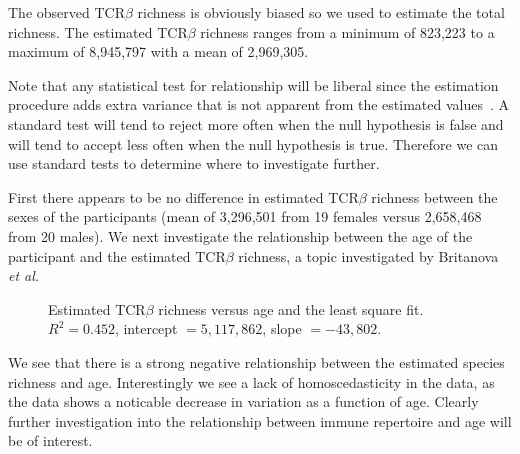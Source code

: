 \documentclass[11pt, titlepage]{article}
\begin{document}
The observed TCR$\beta$ richness is obviously biased so 
we used  to estimate the total richness.
The estimated TCR$\beta$ richness ranges from a minimum
of 823,223 to a maximum of 8,945,797 with a mean
of 2,969,305.  

Note that any statistical test for relationship will be liberal
since the estimation procedure adds extra variance that is not
apparent from the estimated values~\cite{willis2015inference}.
A standard test will tend to reject more often when the
null hypothesis is false and will tend to accept less often
when the null hypothesis is true.
Therefore we can use standard tests to determine
where to investigate further.

First there appears to be no difference in 
estimated TCR$\beta$ richness between the sexes
of the participants (mean of 3,296,501 from 19 females
versus 2,658,468 from 20 males).
We next investigate the relationship between the age
of the participant and the estimated TCR$\beta$ richness,
a topic investigated by Britanova {\em et al.}



 \begin{figure}[h!]
\caption{Estimated TCR$\beta$ richness versus age and the
least square fit.  $R^{2} = 0.452$, intercept $ = 5,117,862$, slope $= -43,802$.
}
\end{figure}

We see that there is a strong negative relationship between the
estimated species richness and age.  Interestingly we see a lack
of homoscedasticity in the data, as the data shows a noticable
decrease in variation as a function of age.  
Clearly further investigation into the relationship between 
immune repertoire and age will be of interest.  
\end{document}
